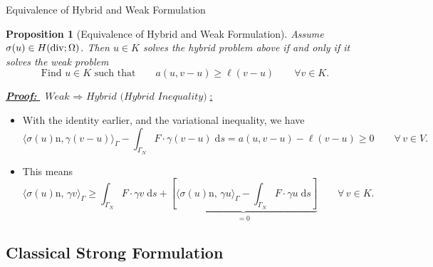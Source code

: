 \documentclass[10pt,aspectratio=169]{beamer}
\newtheorem{proposition}{Proposition}[section]
\def\d{{\mathrm{d}}}
\def\ds{{\d s}}
\newcommand{\diver}{\operatornamewithlimits{div}}
\begin{document}
\begin{frame}{Equivalence of Hybrid and Weak Formulation}
	\begin{proposition}[Equivalence of Hybrid and Weak Formulation]
		Assume $\sigma(u)\in H(\diver;\Omega)$. Then $u\in K$ solves the hybrid problem above if and only if it solves the weak problem
		\begin{equation*}
			\text{Find }u\in K\text{ such that}\qquad a(u,v-u)\ge\ell(v-u)\qquad \forall v\in K.
		\end{equation*}
	\end{proposition}
	\underline{\textbf{\em Proof:} $\ \textit{Weak }\Rightarrow\textit{ Hybrid (Hybrid Inequality)}$:}
	\begin{itemize}
		\item With the identity earlier, and the variational inequality, we have
		      \begin{equation*}
			      \langle \sigma(u)\mathrm n,\gamma(v-u)\rangle_\Gamma - \int_{\Gamma_N}F\cdot\gamma(v-u)\;\ds = a(u,v-u)-\ell(v-u)\ge 0\qquad \forall\,v\in V.
		      \end{equation*}

		\item This means
		      \begin{equation*}
			      \langle\sigma(u)\mathrm{n},\,\gamma v\rangle_\Gamma\ge \int_{\Gamma_N}F\cdot \gamma v\;\ds + \underbrace{\left[\langle\sigma(u)\mathrm{n},\,\gamma u\rangle_\Gamma-\int_{\Gamma_N}F\cdot\gamma u\;\ds\right]}_{ = 0}\qquad \forall\,v\in K.
		      \end{equation*}
	\end{itemize}
\end{frame}

\subsection{Classical Strong Formulation}
\end{document}
